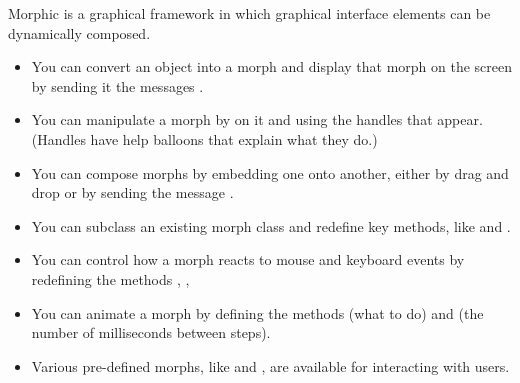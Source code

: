 \documentclass[a4paper,10pt,twoside]{book}
\begin{document}
Morphic is a graphical framework in which graphical interface elements can be dynamically composed.

\begin{itemize}
  \item You can convert an object into a morph and display that morph on the screen by sending it the messages .
  \item You can manipulate a morph by  on it and using the handles that appear. (Handles have help balloons that explain what they do.)
  \item You can compose morphs by embedding one onto another, either by drag and drop or by sending the message .
  \item You can subclass an existing morph class and redefine key methods, like  and .
  \item You can control how a morph reacts to mouse and keyboard events by redefining the methods , , \etc
  \item You can animate a morph by defining the methods  (what to do) and  (the number of milliseconds between steps).
  \item Various pre-defined morphs, like  and , are available for interacting with users.
\end{itemize}

\ifx\wholebook\relax\else
\end{document}
